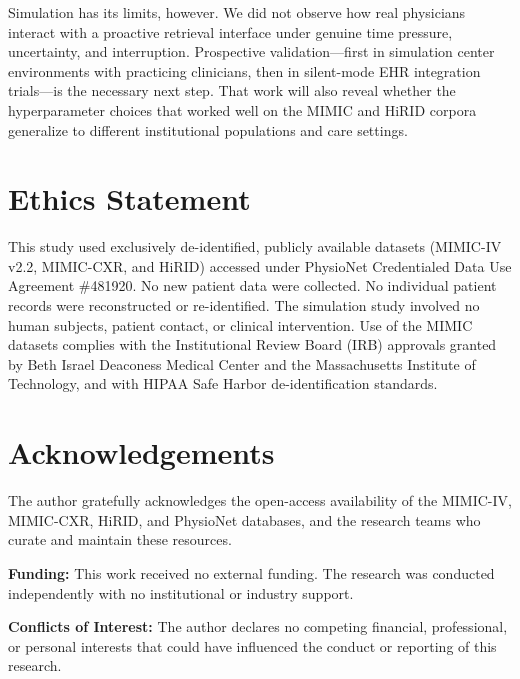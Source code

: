 \documentclass[10pt, onecolumn]{article}
\begin{document}
Simulation has its limits, however. We did not observe how real physicians interact with a proactive retrieval interface under genuine time pressure, uncertainty, and interruption. Prospective validation---first in simulation center environments with practicing clinicians, then in silent-mode EHR integration trials---is the necessary next step. That work will also reveal whether the hyperparameter choices that worked well on the MIMIC and HiRID corpora generalize to different institutional populations and care settings.

\section*{Ethics Statement}
This study used exclusively de-identified, publicly available datasets (MIMIC-IV v2.2, MIMIC-CXR, and HiRID) accessed under PhysioNet Credentialed Data Use Agreement \#481920. No new patient data were collected. No individual patient records were reconstructed or re-identified. The simulation study involved no human subjects, patient contact, or clinical intervention. Use of the MIMIC datasets complies with the Institutional Review Board (IRB) approvals granted by Beth Israel Deaconess Medical Center and the Massachusetts Institute of Technology, and with HIPAA Safe Harbor de-identification standards.

\section*{Acknowledgements}
The author gratefully acknowledges the open-access availability of the MIMIC-IV, MIMIC-CXR, HiRID, and PhysioNet databases, and the research teams who curate and maintain these resources.

\noindent\textbf{Funding:} This work received no external funding. The research was conducted independently with no institutional or industry support.

\noindent\textbf{Conflicts of Interest:} The author declares no competing financial, professional, or personal interests that could have influenced the conduct or reporting of this research.



\end{document}
